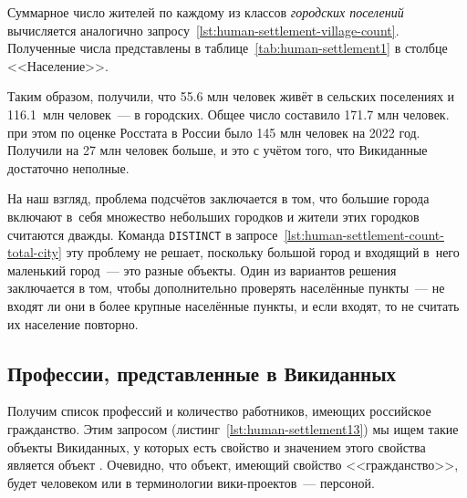 Суммарное число жителей по каждому из классов \emph{городских поселений} 
вычисляется аналогично запросу~\ref{lst:human-settlement-village-count}. 
Полученные числа представлены в таблице~\ref{tab:human-settlement1} в столбце <<Население>>. 

Таким образом, получили, что \num{55.6} млн человек живёт в сельских поселениях и \num{116.1}~млн человек~--- в городских. 
Общее число составило \num{171.7} млн человек. 
при этом по оценке Росстата в России было 145 млн человек на 2022 год. 
Получили на 27 млн человек больше, и это с учётом того, что Викиданные достаточно неполные. 

На наш взгляд, проблема подсчётов заключается в том, 
что большие города включают в~себя множество небольших городков и жители этих городков считаются дважды. 
Команда \lstinline|DISTINCT|%
%
%
%
%
в запросе~\ref{lst:human-settlement-count-total-city} 
эту проблему не решает, поскольку большой город и входящий в~него маленький город~--- это разные объекты. 
Один из вариантов решения заключается в том, 
чтобы дополнительно проверять населённые пункты~---  
не входят ли они в более крупные населённые пункты, 
и если входят, то не считать их население повторно. 



\subsection{Профессии, представленные в Викиданных}

Получим список профессий и количество работников, 
имеющих российское гражданство. 
Этим запросом (листинг~\ref{lst:human-settlement13}) 
мы ищем такие объекты Викиданных, 
у которых есть свойство  
и значением этого свойства является объект . 
Очевидно, что объект, имеющий свойство <<гражданство>>, будет человеком 
или в терминологии вики-проектов~--- персоной. 


